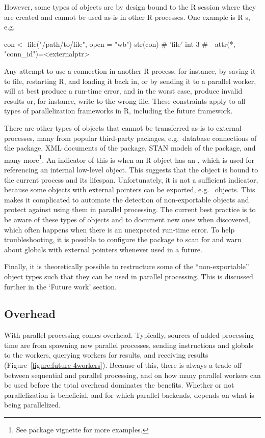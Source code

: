 However, some types of objects are by design bound to the R session
where they are created and cannot be used as-is in other R processes.
One example is R s, e.g.
\begin{example}
con <- file("/path/to/file", open = "wb")
str(con)
#  'file' int 3
#  - attr(*, "conn_id")=<externalptr> 
\end{example}
Any attempt to use a connection in another R process, for instance, by
saving it to file, restarting R, and loading it back in, or by sending
it to a parallel worker, will at best produce a run-time error, and in
the worst case, produce invalid results or, for instance, write to the
wrong file.  These constraints apply to all types of parallelization
frameworks in R, including the future framework.

There are other types of objects that cannot be transferred as-is to
external processes, many from popular third-party packages, e.g.\
database connections of the  package, XML documents of
the \CRANpkg{xml2} package, STAN models of the \CRANpkg{stan} package,
and many more\footnote{See \pkg{future} package vignette
 for more examples.}.
An indicator of this is when an R object has an , which is used for referencing an internal low-level
object. This suggests that the object is bound to the current process
and its lifespan.  Unfortunately, it is not a sufficient indicator,
because some objects with external pointers can be exported,
e.g.\  objects.  This makes it complicated to
automate the detection of non-exportable objects and protect against
using them in parallel processing.  The current best practice is to be
aware of these types of objects and to document new ones when
discovered, which often happens when there is an unexpected run-time
error.  To help troubleshooting, it is possible to configure
the  package to scan for and warn about globals with
external pointers whenever used in a future.

Finally, it is theoretically possible to restructure some of the
``non-exportable'' object types such that they can be used in parallel
processing.  This is discussed further in the `Future work' section.


\subsection{Overhead}
\label{overhead}

With parallel processing comes overhead.  Typically, sources of added
processing time are from spawning new parallel processes,
sending instructions and globals to the workers, querying workers for
results, and receiving results (Figure~\ref{figure:future-4workers}).
Because of this, there is always a trade-off between sequential and
parallel processing, and on how many parallel workers can be used
before the total overhead dominates the benefits.  Whether or not
parallelization is beneficial, and for which parallel backends,
depends on what is being parallelized.

